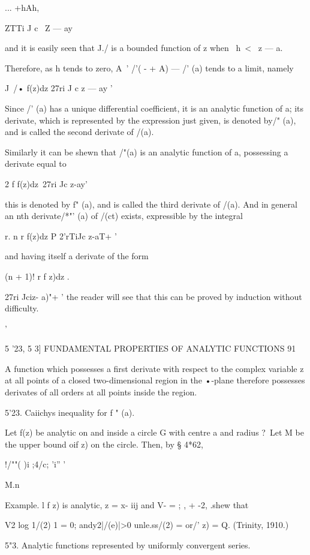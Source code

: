 {{... +hAh,

ZTTi J c \ Z — ay

and it is easily seen that J./ is a bounded function of z when \ h\ <
\ z — a.

Therefore, as h tends to zero, A~' /'( - + A) — /' (a) tends to a
limit, namely

J\ /• f(z)dz 27ri J c z — ay '

Since /' (a) has a unique differential coefficient, it is an analytic
function of a; its derivate, which is represented by the expression
just given, is denoted by/" (a), and is called the second derivate of
/(a).

Similarly it can be shewn that /"(a) is an analytic function of a,
possessing a derivate equal to

2 f f(z)dz\ 27ri Jc z-ay'

this is denoted by f" (a), and is called the third derivate of /(a).
And in general an nth derivate/*"' (a) of /(ct) exists, expressible by
the integral

r. n r f(z)dz P 2'rTiJc z-aT+ '

and having itself a derivate of the form

(n + 1)! r f z)dz .



27ri Jciz- a)"+ ' the reader will see that this can be proved by
induction without difficulty.



 '



5 '23, 5 3] FUNDAMENTAL PROPERTIES OF ANALYTIC FUNCTIONS 91

A function which possesses a first derivate with respect to the
complex variable z at all points of a closed two-dimensional region in
the •-plane therefore possesses derivates of all orders at all points
inside the region.

5'23. Caiichys inequality for f " (a).

Let f(z) be analytic on and inside a circle G with centre a and radius
?\ Let M be the upper bound oif z) on the circle. Then, by § 4*62,

!/""( )i ;4/c; 'i'' '

M.n\

Example. l f z) is analytic, z = x- iij and V- = ; , + -2, .shew that

V2 log 1/(2) 1 = 0; andy2|/(e)|>0 unle.ss/(2) = or/' z) = Q. (Trinity,
1910.)

5"3. Analytic functions represented by uniformly convergent series.

}}
